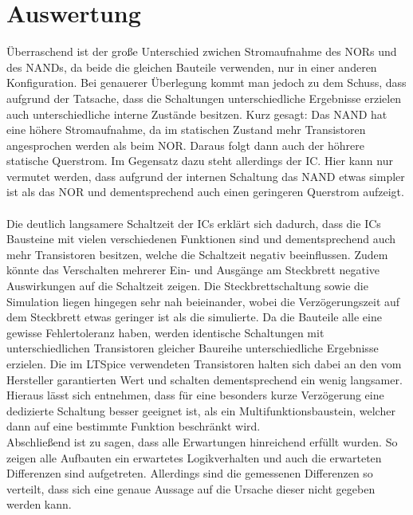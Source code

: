 \documentclass[11pt, a4paper]{article}
\begin{document}
\section*{Auswertung}
Überraschend ist der große Unterschied zwichen Stromaufnahme des NORs und des NANDs, da beide die gleichen Bauteile verwenden, nur in einer anderen Konfiguration. Bei genauerer Überlegung kommt man jedoch zu dem Schuss, dass aufgrund der Tatsache, dass die Schaltungen unterschiedliche Ergebnisse erzielen auch unterschiedliche interne Zustände besitzen. Kurz gesagt: Das NAND hat eine höhere Stromaufnahme, da im statischen Zustand mehr Transistoren angesprochen werden als beim NOR. Daraus folgt dann auch der höhrere statische Querstrom. Im Gegensatz dazu steht allerdings der IC. Hier kann nur vermutet werden, dass aufgrund der internen Schaltung das NAND etwas simpler ist als das NOR und dementsprechend auch einen geringeren Querstrom aufzeigt.
\\
\\
Die deutlich langsamere Schaltzeit der ICs erklärt sich dadurch, dass die ICs Bausteine mit vielen verschiedenen Funktionen sind und dementsprechend auch mehr Transistoren besitzen, welche die Schaltzeit negativ beeinflussen. Zudem könnte das Verschalten mehrerer Ein- und Ausgänge am Steckbrett negative Auswirkungen auf die Schaltzeit zeigen.
Die Steckbrettschaltung sowie die Simulation liegen hingegen sehr nah beieinander, wobei die Verzögerungszeit auf dem Steckbrett etwas geringer ist als die simulierte. Da die Bauteile alle eine gewisse Fehlertoleranz haben, werden identische Schaltungen mit unterschiedlichen Transistoren gleicher Baureihe unterschiedliche Ergebnisse erzielen. Die im LTSpice verwendeten Transistoren halten sich dabei an den vom Hersteller garantierten Wert und schalten dementsprechend ein wenig langsamer.
\\
Hieraus lässt sich entnehmen, dass für eine besonders kurze Verzögerung eine dedizierte Schaltung besser geeignet ist, als ein Multifunktionsbaustein, welcher dann auf eine bestimmte Funktion beschränkt wird.
\\
Abschließend ist zu sagen, dass alle Erwartungen hinreichend erfüllt wurden. So zeigen alle Aufbauten ein erwartetes Logikverhalten und auch die erwarteten Differenzen sind aufgetreten. Allerdings sind die gemessenen Differenzen so verteilt, dass sich eine genaue Aussage auf die Ursache dieser nicht gegeben werden kann.
\end{document}
